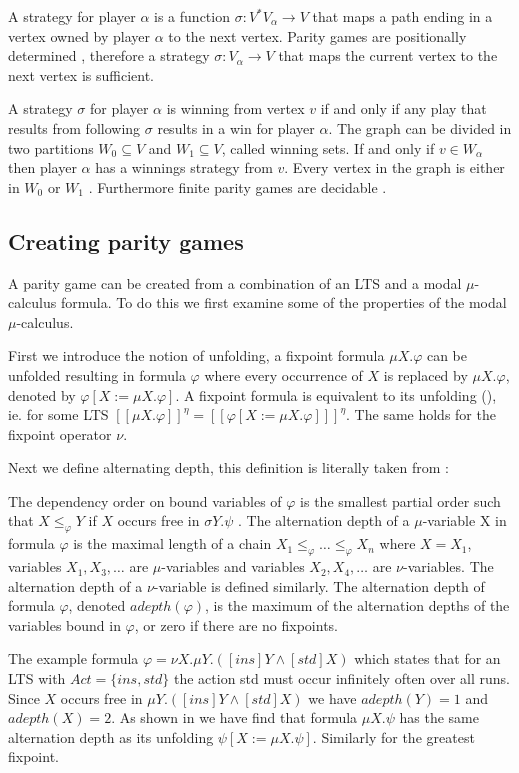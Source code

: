 A strategy for player $\alpha$ is a function $\sigma : V^*V_\alpha \rightarrow V$ that maps a path ending in a vertex owned by player $\alpha$ to the next vertex. Parity games are positionally determined \cite{Bradfield2018}, therefore a strategy $\sigma: V_\alpha \rightarrow V$ that maps the current vertex to the next vertex is sufficient. 

A strategy $\sigma$ for player $\alpha$ is winning from vertex $v$ if and only if any play that results from following $\sigma$ results in a win for player $\alpha$. The graph can be divided in two partitions $W_0 \subseteq V$ and $W_1 \subseteq V$, called winning sets. If and only if $v \in W_\alpha$ then player $\alpha$ has a winnings strategy from $v$. Every vertex in the graph is either in $W_0$ or $W_1$ \cite{Bradfield2018}. Furthermore finite parity games are decidable \cite{Bradfield2018}.


\subsection{Creating parity games}
A parity game can be created from a combination of an LTS and a modal $\mu$-calculus formula. To do this we first examine some of the properties of the modal $\mu$-calculus. 

First we introduce the notion of unfolding, a fixpoint formula $\mu X . \varphi$ can be unfolded resulting in formula $\varphi$ where every occurrence of $X$ is replaced by $\mu X . \varphi$, denoted by $\varphi [ X:= \mu X . \varphi]$. A fixpoint formula is equivalent to its unfolding (\cite{Bradfield2018}), ie. for some LTS $[\![\mu X . \varphi]\!]^\eta = [\![\varphi[X:=\mu X . \varphi]]\!]^\eta$. The same holds for the fixpoint operator $\nu$.

Next we define alternating depth, this definition is literally taken from \cite{Bradfield2018}:
\begin{definition}
	The dependency order on bound variables of $\varphi$	is the smallest partial order such that $X \leq_\varphi Y$ if $X$ occurs free in $\sigma Y. \psi$ . The alternation depth of a $\mu$-variable X in formula $\varphi $ is the maximal length of a chain $X_1 \leq_\varphi  \dots \leq_\varphi X_n$ where $X = X_1$, variables $X_1, X_3, \dots$ are $\mu$-variables and variables $X_2, X_4, \dots$ are $\nu$-variables. The alternation depth of a $\nu$-variable is defined similarly. The alternation depth of formula $\varphi$, denoted $adepth(\varphi)$, is the maximum of the alternation depths of the variables bound in $\varphi$, or zero if there are no fixpoints.
\end{definition}
The example formula $\varphi = \nu X. \mu Y. ([ins]Y \wedge [std] X)$ which states that for an LTS with $Act = \{ ins, std\}$ the action std must occur infinitely often over all runs. Since $X$ occurs free in $\mu Y. ([ins] Y \wedge [std]X)$ we have $adepth(Y) = 1$ and $adepth(X) = 2$. As shown in \cite{Bradfield2018} we have find that formula $\mu X. \psi$ has the same alternation depth as its unfolding $\psi[X:=\mu X. \psi]$. Similarly for the greatest fixpoint.

